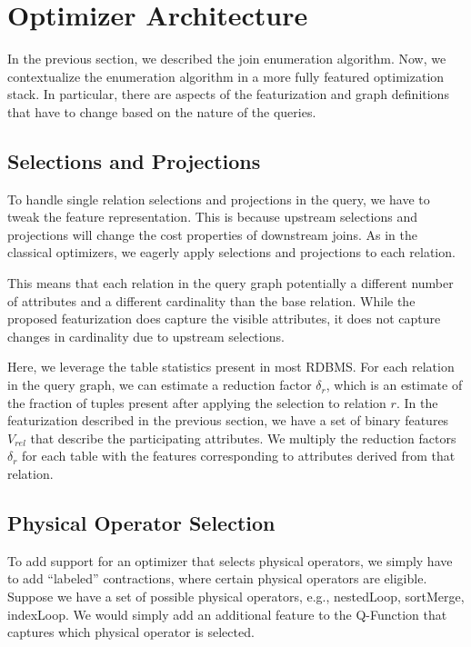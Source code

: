 \section{Optimizer Architecture}
In the previous section, we described the join enumeration algorithm. Now, we contextualize the enumeration algorithm in a more fully featured optimization stack. In particular, there are aspects of the featurization and graph definitions that have to change based on the nature of the queries.

\subsection{Selections and Projections}
To handle single relation selections and projections in the query, we have to tweak the feature representation. This is because upstream selections and projections will change the cost properties of downstream joins. As in the classical optimizers, we eagerly apply selections and projections to each relation. 

This means that each relation in the query graph potentially a different number of attributes and a different cardinality than the base relation. While the proposed featurization does capture the visible attributes, it does not capture changes in cardinality due to upstream selections. 

Here, we leverage the table statistics present in most RDBMS. For each relation in the query graph, we can estimate a reduction factor $\delta_{r}$, which is an estimate of the fraction of tuples present after applying the selection to relation $r$. 
In the featurization described in the previous section, we have a set of binary features $V_{rel}$ that describe the participating attributes.
We multiply the reduction factors $\delta_r$ for each table with the features corresponding to attributes derived from that relation.

\subsection{Physical Operator Selection}
To add support for an optimizer that selects physical operators, we simply have to add ``labeled'' contractions, where certain physical operators are eligible. Suppose we have a set of possible physical operators, e.g., \textsf{nestedLoop}, \textsf{sortMerge}, \textsf{indexLoop}. We would simply add an additional feature to the Q-Function that captures which physical operator is selected.

